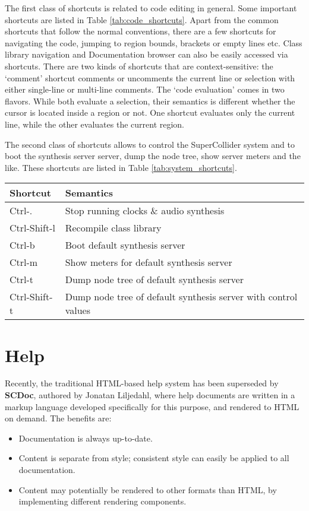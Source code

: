 \documentclass[11pt,a4paper]{article}
\begin{document}
The first class of shortcuts is related to code editing in general. Some important shortcuts are listed in Table
\ref{tab:code_shortcuts}. Apart from the common shortcuts that follow the normal conventions, there are a few shortcuts
for navigating the code, jumping to region bounds, brackets or empty lines etc. Class library navigation and
Documentation browser can also be easily accessed via shortcuts. There are two kinds of shortcuts that are
context-sensitive: the `comment' shortcut comments or uncomments the current line or selection with either single-line
or multi-line comments. The `code evaluation' comes in two flavors. While both evaluate a selection, their semantics is
different whether the cursor is located inside a region or not. One shortcut evaluates only the current line, while the
other evaluates the current region.

The second class of shortcuts allows to control the SuperCollider system and to boot the synthesis server server, dump
the node tree, show server meters and the like. These shortcuts are listed in Table \ref{tab:system_shortcuts}.

\begin{table*}[b]
\begin{tabular}{  l  l  }
  \toprule
  Shortcut & Semantics \\
  \midrule

  Ctrl-. & Stop running clocks \& audio synthesis \\
  Ctrl-Shift-l & Recompile class library \\
  Ctrl-b & Boot default synthesis server \\
  Ctrl-m & Show meters for default synthesis server \\
  Ctrl-t & Dump node tree of default synthesis server \\
  Ctrl-Shift-t & Dump node tree of default synthesis server with control values \\

  \bottomrule
\end{tabular}
\caption{System Control Shortcuts}
\label{tab:system_shortcuts}
\end{table*}


\section{Help}

Recently, the traditional HTML-based help system has been superseded by \textbf{SCDoc}, authored by
Jonatan Liljedahl, where help documents are written in a markup language developed specifically
for this purpose, and rendered to HTML on demand. The benefits are:
\begin{itemize}
 \item Documentation is always up-to-date.
 \item Content is separate from style; consistent style can easily be applied to all documentation.
 \item Content may potentially be rendered to other formats than HTML, by implementing different
rendering components.
\end{itemize}
\end{document}
